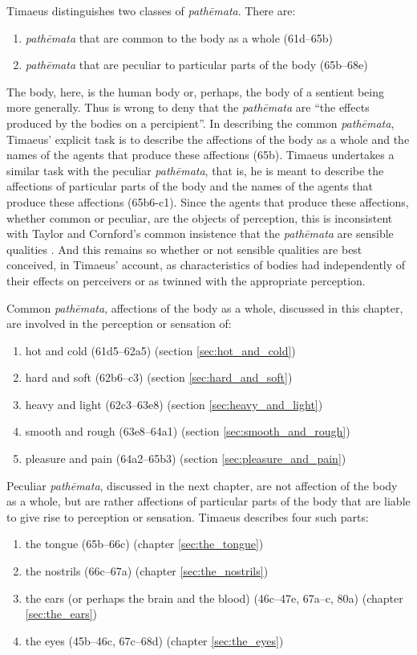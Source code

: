 Timaeus distinguishes two classes of \emph{pathēmata}. There are:
\begin{enumerate}
	\item \emph{pathēmata} that are common to the body as a whole (61d--65b)
	\item \emph{pathēmata} that are peculiar to particular parts of the body (65b--68e)
\end{enumerate}
The body, here, is the human body or, perhaps, the body of a sentient being more generally. Thus \citet[431]{Taylor:1928qb} is wrong to deny that the \emph{pathēmata} are ``the effects produced by the bodies on a percipient''. In describing the common \emph{pathēmata}, Timaeus' explicit task is to describe the affections of the body as a whole and the names of the agents that produce these affections (65b). Timaeus undertakes a similar task with the peculiar \emph{pathēmata}, that is, he is meant to describe the affections of particular parts of the body and the names of the agents that produce these affections (65b6-c1). Since the agents that produce these affections, whether common or peculiar, are the objects of perception, this is inconsistent with Taylor and Cornford's common insistence that the \emph{pathēmata} are sensible qualities \citep[see][225, n8]{Archer-Hind:1888qd}. And this remains so whether or not sensible qualities are best conceived, in Timaeus' account, as characteristics of bodies had independently of their effects on perceivers or as twinned with the appropriate perception. 

Common \emph{pathēmata}, affections of the body as a whole, discussed in this chapter, are involved in the perception or sensation of:
\begin{enumerate}
 	\item hot and cold (61d5--62a5) (section \ref{sec:hot_and_cold})
 	\item hard and soft (62b6--c3) (section \ref{sec:hard_and_soft})
 	\item heavy and light (62c3--63e8) (section \ref{sec:heavy_and_light})
 	\item smooth and rough (63e8--64a1) (section \ref{sec:smooth_and_rough})
 	\item pleasure and pain (64a2--65b3) (section \ref{sec:pleasure_and_pain})
\end{enumerate}

Peculiar \emph{pathēmata}, discussed in the next chapter, are not affection of the body as a whole, but are rather affections of particular parts of the body that are liable to give rise to perception or sensation. Timaeus describes four such parts:
\begin{enumerate}
	\item the tongue (65b--66c) (chapter \ref{sec:the_tongue})
	\item the nostrils (66c--67a) (chapter \ref{sec:the_nostrils})
	\item the ears (or perhaps the brain and the blood) (46c--47e, 67a--c, 80a) (chapter \ref{sec:the_ears})
	\item the eyes (45b--46c, 67c--68d) (chapter \ref{sec:the_eyes})
\end{enumerate}


